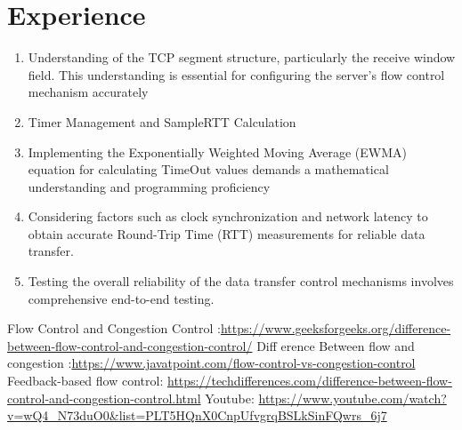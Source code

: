 \documentclass[11pt]{article}
\begin{document}








\section{Experience}
\begin{enumerate}
    \item  Understanding of the TCP segment structure, particularly the receive window field. This understanding is essential for configuring the server's flow control mechanism accurately 
    \item Timer Management and SampleRTT Calculation
    \item Implementing the Exponentially Weighted Moving Average (EWMA) equation for calculating TimeOut values demands a mathematical understanding and programming proficiency
    \item Considering factors such as clock synchronization and network latency to obtain accurate Round-Trip Time (RTT) measurements for reliable data transfer.
    \item Testing the overall reliability of the data transfer control mechanisms involves comprehensive end-to-end testing.
    
\end{enumerate}





\begin{thebibliography}{1}
   Flow Control and Congestion Control :\url{https://www.geeksforgeeks.org/difference-between-flow-control-and-congestion-control/}
   Diff erence Between flow and congestion :\url{https://www.javatpoint.com/flow-control-vs-congestion-control}
   Feedback-based flow control: \url{https://techdifferences.com/difference-between-flow-control-and-congestion-control.html}
   Youtube: \url{https://www.youtube.com/watch?v=wQ4_N73duO0&list=PLT5HQnX0CnpUfvgrqBSLkSinFQwrs_6j7}
 
  

 
\end{thebibliography}
\end{document}
